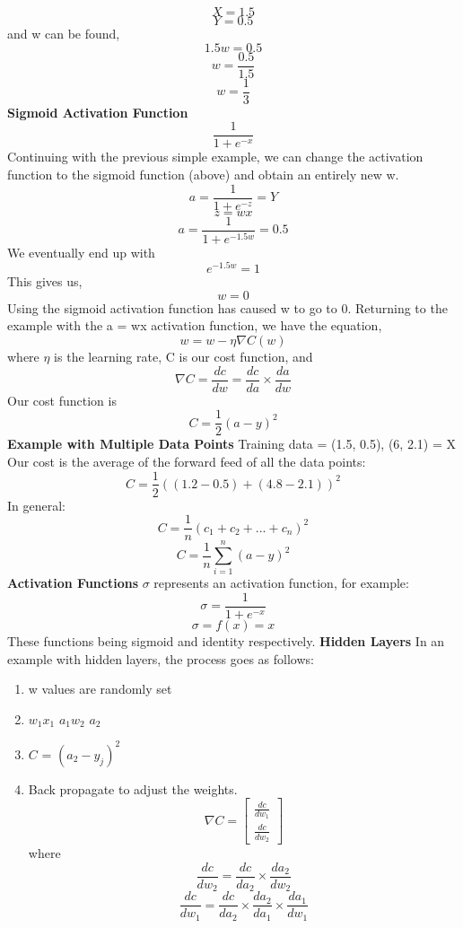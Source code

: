 \[X = 1.5\]
\[Y = 0.5\]
and w can be found,
\[1.5w = 0.5\]
\[w = \frac{0.5}{1.5}\]
\[w = \frac{1}{3}\]
\textbf{Sigmoid Activation Function}
\vspace{5mm}
\[\frac{1}{1 + e^{-x}}\]
Continuing with the previous simple example, we can change the activation function to the sigmoid function (above) and obtain an entirely new w.
\[a = \frac{1}{1 + e^{-z}} = Y\]
\[z = wx\]
\[a = \frac{1}{1 + e^{-1.5w}} = 0.5\]
We eventually end up with
\[e^{-1.5w} = 1\]
This gives us,
\[w = 0\]
Using the sigmoid activation function has caused w to go to 0.
\vspace{5mm}
\newline
Returning to the example with the a = wx activation function, we have the equation,
\[w = w - \eta\nabla C(w)\]
where $\eta$ is the learning rate, C is our cost function, and \[\nabla C = \frac{dc}{dw} = \frac{dc}{da} \times \frac{da}{dw}\]
Our cost function is \[C = \frac{1}{2}(a-y)^2\]
\textbf{Example with Multiple Data Points}
\newline
Training data = {(1.5, 0.5), (6, 2.1)} = X
\newline
Our cost is the average of the forward feed of all the data points:
\[C = \frac{1}{2}((1.2 - 0.5) + (4.8 - 2.1))^2\]
In general:
\[C  = \frac{1}{n}(c_1+c_2+...+c_n)^2\]
\[C = \frac{1}{n}\sum_{i=1}^n (a - y)^2\]
\textbf{Activation Functions}
\newline
$\sigma$ represents an activation function, for example:
\[\sigma = \frac{1}{1 + e^{-x}}\]
\[\sigma = f(x) = x\]
These functions being sigmoid and identity respectively.
\vspace{5mm}
\newline
\textbf{Hidden Layers}
\newline
In an example with hidden layers, the process goes as follows:
\begin{enumerate}
    \item w values are randomly set
    \item $w_1x_1$ \rightarrow $a_1w_2$ \rightarrow $a_2$
    \item $C$ = $(a_2 - y_j)^2$
    \item Back propagate to adjust the weights. \[\nabla C = \begin{bmatrix}
        \frac{dc}{dw_1}\\ \frac{dc}{dw_2}
    \end{bmatrix}\]
    where 
    \[\frac{dc}{dw_2} = \frac{dc}{da_2} \times \frac{da_2}{dw_2}\]
    \[\frac{dc}{dw_1} = \frac{dc}{da_2} \times \frac{da_2}{da_1} \times \frac{da_1}{dw_1}\]
\end{enumerate}
